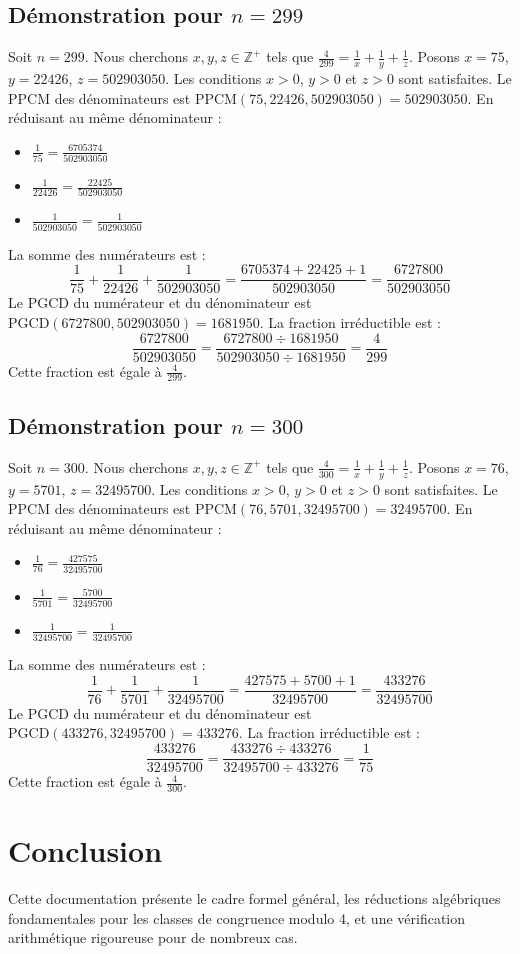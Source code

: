 \documentclass[11pt,a4paper]{article}
\begin{document}
\subsection{Démonstration pour $n = 299$}
Soit $n = 299$. Nous cherchons $x, y, z \in \mathbb{Z}^{+}$ tels que $\frac{4}{299} = \frac{1}{x} + \frac{1}{y} + \frac{1}{z}$.
Posons $x = 75$, $y = 22426$, $z = 502903050$.
Les conditions $x > 0$, $y > 0$ et $z > 0$ sont satisfaites.
Le PPCM des dénominateurs est $\text{PPCM}(75, 22426, 502903050) = 502903050$.
En réduisant au même dénominateur :
\begin{itemize}
    \item $\frac{1}{75} = \frac{6705374}{502903050}$
    \item $\frac{1}{22426} = \frac{22425}{502903050}$
    \item $\frac{1}{502903050} = \frac{1}{502903050}$
\end{itemize}
La somme des numérateurs est :
$$ \frac{1}{75} + \frac{1}{22426} + \frac{1}{502903050} = \frac{6705374 + 22425 + 1}{502903050} = \frac{6727800}{502903050} $$
Le PGCD du numérateur et du dénominateur est $\text{PGCD}(6727800, 502903050) = 1681950$.
La fraction irréductible est :
$$ \frac{6727800}{502903050} = \frac{6727800 \div 1681950}{502903050 \div 1681950} = \frac{4}{299} $$
Cette fraction est égale à $\frac{4}{299}$.

\subsection{Démonstration pour $n = 300$}
Soit $n = 300$. Nous cherchons $x, y, z \in \mathbb{Z}^{+}$ tels que $\frac{4}{300} = \frac{1}{x} + \frac{1}{y} + \frac{1}{z}$.
Posons $x = 76$, $y = 5701$, $z = 32495700$.
Les conditions $x > 0$, $y > 0$ et $z > 0$ sont satisfaites.
Le PPCM des dénominateurs est $\text{PPCM}(76, 5701, 32495700) = 32495700$.
En réduisant au même dénominateur :
\begin{itemize}
    \item $\frac{1}{76} = \frac{427575}{32495700}$
    \item $\frac{1}{5701} = \frac{5700}{32495700}$
    \item $\frac{1}{32495700} = \frac{1}{32495700}$
\end{itemize}
La somme des numérateurs est :
$$ \frac{1}{76} + \frac{1}{5701} + \frac{1}{32495700} = \frac{427575 + 5700 + 1}{32495700} = \frac{433276}{32495700} $$
Le PGCD du numérateur et du dénominateur est $\text{PGCD}(433276, 32495700) = 433276$.
La fraction irréductible est :
$$ \frac{433276}{32495700} = \frac{433276 \div 433276}{32495700 \div 433276} = \frac{1}{75} $$
Cette fraction est égale à $\frac{4}{300}$.

\section{Conclusion}

Cette documentation présente le cadre formel général, les réductions algébriques fondamentales pour les classes de congruence modulo 4, et une vérification arithmétique rigoureuse pour de nombreux cas.
\end{document}
